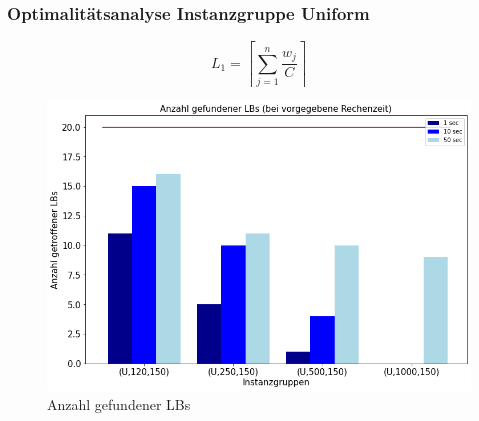 \documentclass{beamer}
\begin{document}
\begin{frame}

\frametitle{Optimalitätsanalyse Instanzgruppe Uniform}
\begin{footnotesize}
\begin{equation}
L_1 = \left\lceil\sum_{j=1}^{n} \frac{w_j}{C}\right\rceil
\end{equation}
\end{footnotesize}


\begin{figure}[!htbp]
\begin{center}
\includegraphics[scale=0.3]{img/lb_unif.png}
\end{center}
\caption{Anzahl gefundener LBs}
\label{fig:architecture}
\end{figure}



\end{frame}
%
%
\end{document}
